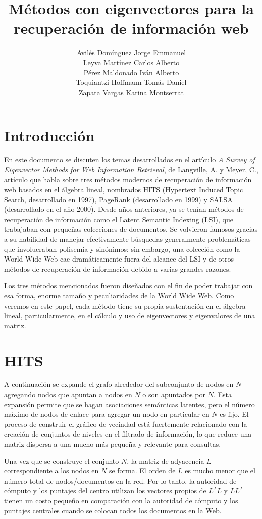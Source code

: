\documentclass[12pt]{article}
\author{
Avilés Domínguez Jorge Emmanuel \\
Leyva Martínez Carlos Alberto \\ 
Pérez Maldonado Iván Alberto \\
Toquiantzi Hoffmann Tomás Daniel \\
Zapata Vargas Karina Montserrat \\
}
\title{Métodos con eigenvectores para la recuperación de información web}
\begin{document}
\maketitle

\section{Introducción}
En este documento se discuten los temas desarrollados en el artículo \textit{A Survey of Eigenvector Methods for Web Information Retrieval}, de Langville, A. y Meyer, C., artículo que habla sobre tres métodos modernos de recuperación de información web basados en el álgebra lineal, nombrados HITS (Hypertext Induced Topic Search, desarrollado en 1997), PageRank (desarrollado en 1999) y SALSA (desarrollado en el año 2000). Desde años anteriores, ya se tenían métodos de recuperación de información como el Latent Semantic Indexing (LSI), que trabajaban con pequeñas colecciones de documentos. Se volvieron famosos gracias a su habilidad de manejar efectivamente búsquedas generalmente problemáticas que involucraban polisemia y sinónimos; sin embargo, una colección como la World Wide Web cae dramáticamente fuera del alcance del LSI y de otros métodos de recuperación de información debido a varias grandes razones. \par
Los tres métodos mencionados fueron diseñados con el fin de poder trabajar con esa forma, enorme tamaño y peculiaridades de la World Wide Web. Como veremos en este papel, cada método tiene su propia sustentación en el álgebra lineal, particularmente, en el cálculo y uso de eigenvectores y eigenvalores de una matriz. \par

\section{HITS}
A continuación se expande el grafo alrededor del subconjunto de nodos en $N$ agregando nodos que apuntan a nodos en $N$ o son apuntados por $N$. Esta expansión permite que se hagan asociaciones semánticas latentes, pero el número máximo de nodos de enlace para agregar un nodo en particular en $N$ es fijo. El proceso de construir el gráfico de vecindad está fuertemente relacionado con la creación de conjuntos de niveles en el filtrado de información, lo que reduce una matriz dispersa a una mucho más pequeña y relevante para consultas. \par
Una vez que se construye el conjunto $N$, la matriz de adyacencia $L$ correspondiente a los nodos en $N$ se forma. El orden de $L$ es mucho menor que el número total de nodos/documentos en la red. Por lo tanto, la autoridad de cómputo y los puntajes del centro utilizan los vectores propios de $L^TL$ y $LL^T$ tienen un costo pequeño en comparación con la autoridad de cómputo y los puntajes centrales cuando se colocan todos los documentos en la Web. 
\end{document}

